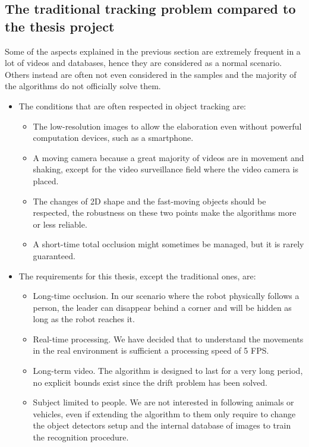 \subsection{The traditional tracking problem compared to the thesis project} \label{sec:trackingBaseliveVsThesis}
Some of the aspects explained in the previous section are extremely frequent in a lot of videos and databases, hence they are considered as a normal scenario. Others instead are often not even considered in the samples and the majority of the algorithms do not officially solve them.
\begin{itemize}
	\item The conditions that are often respected in object tracking are:
	\begin{itemize}
		\item The low-resolution images to allow the elaboration even without powerful computation devices, such as a smartphone. 
		\item A moving camera because a great majority of videos are in movement and shaking, except for the video surveillance field where the video camera is placed.
		\item The changes of 2D shape and the fast-moving objects should be respected, the robustness on these two points make the algorithms more or less reliable. 
		\item A short-time total occlusion might sometimes be managed, but it is rarely guaranteed.
	\end{itemize}

	\item The requirements for this thesis, except the traditional ones, are:
	\begin{itemize}
		\item Long-time occlusion. In our scenario where the robot physically follows a person, the leader can disappear behind a corner and will be hidden as long as the robot reaches it.
		\item Real-time processing. We have decided that to understand the movements in the real environment is sufficient a processing speed of 5 FPS.
		\item Long-term video. The algorithm is designed to last for a very long period, no explicit bounds exist since the drift problem has been solved.
		\item Subject limited to people. We are not interested in following animals or vehicles, even if extending the algorithm to them only require to change the object detectors setup and the internal database of images to train the recognition procedure.
	\end{itemize}
	
\end{itemize}



